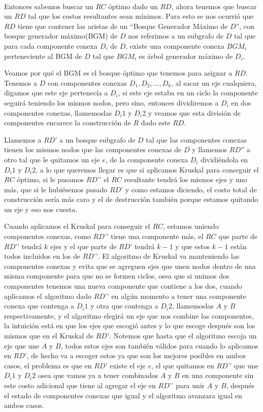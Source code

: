 \\
\par
Entonces sabemos buscar un $RC$ óptimo dado un $RD$, ahora tenemos que buscar un $RD$ tal que los costos resultantes sean mínimos. Para esto se nos ocurrió que $RD$ tiene que contener las aristas de un “Bosque Generador Máximo de $D$”, con bosque generador máximo(BGM) de $D$ nos referimos a un subgrafo de $D$ tal que para cada componente conexa $D_i$ de $D$, existe una componente conexa $BGM_i$ perteneciente al BGM de $D$ tal que $BGM_i$ es árbol generador máximo de $D_i$. 
\\
\par
Veamos por qué el BGM es el bosque óptimo que tenemos para asignar a $RD$. Tenemos a $D$ con componentes conexas $D_1 , D_2 , … , D_k$, al sacar un eje cualquiera, digamos que este eje pertenecía a $D_i$, si este eje estaba en un ciclo la componente seguirá teniendo los mismos nodos, pero sino, entonces dividiremos a $D_i$ en dos componentes conexas, llamemoslas $D_i1$ y $D_i2$ y veamos que esta división de componentes encarece la construcción de $R$ dado este $RD$. 
\\
\par
Llamemos a $RD'$ a un bosque subgrafo de $D$ tal que las componentes conexas tienen los mismos nodos que las componentes conexas de $D$ y llamemos $RD''$ a otro tal que le quitamos un eje $e$, de la componente conexa $D_i$ dividiéndola en $D_i1$ y $D_i2$, a lo que queremos llegar es que si aplicamos Kruskal para conseguir el $RC$ óptimo, si le pasamos $RD’’$ el $RC$ resultante tendrá los mismos ejes y uno más, que si le hubiésemos pasado $RD’$ y como estamos diciendo, el costo total de construcción sería más caro y el de destrucción también porque estamos quitando un eje y eso nos cuesta.
\\
\par
Cuando aplicamos el Kruskal para conseguir el $RC$, estamos uniendo componentes conexas, como $RD’’$ tiene una componente más, el $RC$ que parte de $RD’’$ tendrá $k$ ejes y el que parte de $RD’$ tendrá $k-1$ y que estos $k-1$ están todos incluidos en los de $RD’’$. El algoritmo de Kruskal va manteniendo las componentes conexas y evita que se agreguen ejes que unen nodos dentro de una misma componente para que no se formen ciclos, osea que si unimos dos componentes tenemos una nueva componente que contiene a los dos, cuando aplicamos el algoritmo dado $RD’’$ en algún momento a tener una componente conexa que contenga a $D_i1$  y otra que contenga a $D_i2$, llamemoslas $A$ y $B$ respectivamente, y el algoritmo elegirá un eje que nos combine las componentes, la intuición está en que los ejes que escogió antes y lo que escoge después son los mismos que en el Kruskal de $RD’$. Notemos que hasta que el algoritmo escoja un eje que une $A$ y $B$, todos estos ejes son también válidos para cuando lo aplicamos en $RD’$, de hecho va a escoger estos ya que son los mejores posibles en ambos casos, el problema es que en $RD’$ existe el eje $e$, el que quitamos en $RD’’$ que une $D_i1$ y $D_i2$ osea que vamos ya a tener combinados $A$ y $B$ en una componente sin este costo adicional que tiene al agregar el eje en $RD’’$ para unir $A$ y $B$, después el estado de componentes conexas que igual y el algoritmo avanzara igual en ambos casos.
